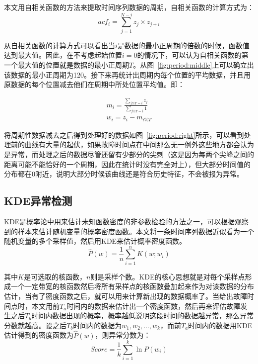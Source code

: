 本文用自相关函数的方法来提取时间序列数据的周期\cite{rabiner1977use}，自相关函数的计算方式为：
\begin{equation*}
  acf_i = \sum_{j=1}^{N-i}z_j\times z_{j+i}
\end{equation*}

从自相关函数的计算方式可以看出当$i$是数据的最小正周期的倍数的时候，函数值达到最大值。因此，在不考虑起始位置$i=0$的情况下，可以认为自相关函数的第一个最大值的位置就是数据的最小正周期$T$。从图~\ref{fig:period:middle}上可以确立出该数据的最小正周期为120。接下来再统计出周期内每个位置的平均数据，并且用原数据的每个位置减去他们在周期中所处位置平均值。即：

\begin{equation*}
  \begin{aligned}
  m_i = \frac{\sum_{j\%T = i}z_j}{\sum_{j\%T = i}1}\\
  w_i = z_i - m_{i\%T}
  \end{aligned}
\end{equation*}

将周期性数据减去之后得到处理好的数据如图~\ref{fig:period:right}所示，可以看到处理前的曲线有大量的起伏，如果故障时间点在中间那么无一例外这些地方都会认为是异常，而处理之后的数据尽管还留有少部分的尖刺（这是因为每两个尖峰之间的距离可能不能恰好的一个周期，因此在统计时没有完全对上），但大部分时间值的分布都在0附近，说明大部分时候该曲线还是符合历史特征，不会被报为异常。

\subsection{KDE异常检测}
KDE是概率论中用来估计未知函数密度的非参数检验的方法之一，可以根据观察到的样本来估计随机变量的概率密度函数。本文将一条时间序列数据近似看为一个随机变量的多个采样值，然后用KDE来估计概率密度函数。
\begin{equation*}
\hat{P}(w) = \frac{1}{n}\sum_{i=1}^nK(w;w_i)
\end{equation*}

其中$K$是可选取的核函数，$n$则是采样个数。KDE的核心思想就是对每个采样点形成一个一定带宽的核函数然后将所有采样点的核函数叠加起来作为对该数据的分布估计，当有了密度函数之后，就可以用来计算新出现的数据概率了。当给出故障时间点时，本文用前$T_a$时间内的数据来估计出一个密度函数，然后再来评估故障发生之后$T_b$时间内数据出现的概率，概率越低说明这段时间的数据越异常，那么异常分数就越高。设之后$T_b$时间内的数据为$w_1,w_2,\dots,w_k$，而前$T_a$时间内的数据用KDE估计得到的密度函数为$\hat{P}(w)$，则异常分数为：
\begin{equation*}
  Score = \frac{1}{k}\sum_{i=1}^k\ln P(w_i)
\end{equation*}

